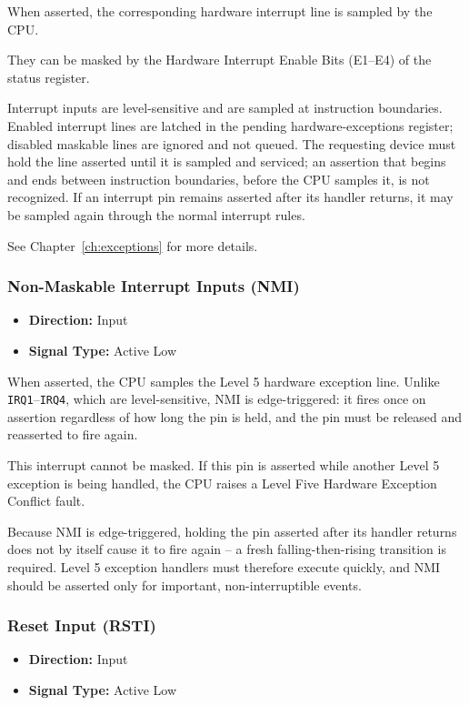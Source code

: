 When asserted, the corresponding hardware interrupt line is sampled by the CPU.

They can be masked by the Hardware Interrupt Enable Bits (E1--E4) of the status register.

Interrupt inputs are level-sensitive and are sampled at instruction boundaries. Enabled interrupt lines are latched in
the pending hardware-exceptions register; disabled maskable lines are ignored and not queued. The requesting device
must hold the line asserted until it is sampled and serviced; an assertion that begins and ends between instruction
boundaries, before the CPU samples it, is not recognized. If an interrupt pin remains asserted after its handler
returns, it may be sampled again through the normal interrupt rules.

See Chapter~\ref{ch:exceptions} for more details.

\subsubsection{Non-Maskable Interrupt Inputs (NMI)}

\begin{itemize}
	\item \textbf{Direction:} Input
	\item \textbf{Signal Type:} Active Low
\end{itemize}

When asserted, the CPU samples the Level 5 hardware exception line. Unlike \texttt{IRQ1}--\texttt{IRQ4}, which are
level-sensitive, NMI is edge-triggered: it fires once on assertion regardless of how long the pin is held, and the pin
must be released and reasserted to fire again.

This interrupt cannot be masked. If this pin is asserted while another Level 5 exception is being handled, the CPU
raises a Level Five Hardware Exception Conflict fault.

Because NMI is edge-triggered, holding the pin asserted after its handler returns does not by itself cause it to fire
again -- a fresh falling-then-rising transition is required. Level 5 exception handlers must therefore execute quickly,
and NMI should be asserted only for important, non-interruptible events.

\subsubsection{Reset Input (RSTI)}

\begin{itemize}
	\item \textbf{Direction:} Input
	\item \textbf{Signal Type:} Active Low
\end{itemize}

